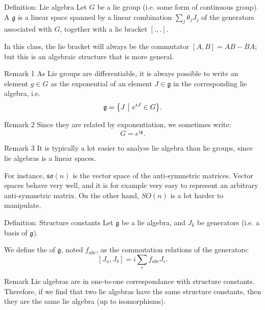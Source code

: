 \documentclass[a4paper]{article}
\begin{document}
\begin{parag}{Definition: Lie algebra}
    Let $G$ be a lie group (i.e. some form of continuous group). A  $\mathfrak{g}$ is a linear space spanned by a linear combination $\sum_{j} \theta_j J_{j}$ of the generators associated with $G$, together with a lie bracket $\left[., .\right]$.

    In this class, the lie bracket will always be the commutator $\left[A, B\right] = AB - BA$; but this is an algebraic structure that is more general.

    \begin{subparag}{Remark 1}
        As Lie groups are differentiable, it is always possible to write an element $g \in G$ as the exponential of an element $J \in \mathfrak{g}$ in the corresponding lie algebra, i.e. 
        \[\mathfrak{g} = \left\{J \suchthat e^{i J} \in G\right\}.\]
    \end{subparag}

    \begin{subparag}{Remark 2}
        Since they are related by exponentiation, we sometimes write:
        \[G = e^{i \mathfrak{g}}.\]
    \end{subparag}

    \begin{subparag}{Remark 3}
        It is typically a lot easier to analyse lie algebra than lie groups, since lie algebras is a linear spaces.

        For instance, $\mathfrak{so}\left(n\right)$ is the vector space of the anti-symmetric matrices. Vector spaces behave very well, and it is for example very easy to represent an arbitrary anti-symmetric matrix. On the other hand, $SO\left(n\right)$ is a lot harder to manipulate.
    \end{subparag}
\end{parag}

\begin{parag}{Definition: Structure constants}
    Let $\mathfrak{g}$ be a lie algebra, and $J_k$ be generators (i.e. a basis of $\mathfrak{g}$).

    We define the  of $\mathfrak{g}$, noted $f_{abc}$, as the commutation relations of the generators: 
    \[\left[J_a, J_b\right] = i \sum_{c} f_{abc} J_c.\]

    \begin{subparag}{Remark}
        Lie algebras are in one-to-one correspondance with structure constants. Therefore, if we find that two lie algebras have the same structure constants, then they are the same lie algebra (up to isomorphisms).
    \end{subparag}
\end{parag}
\end{document}
